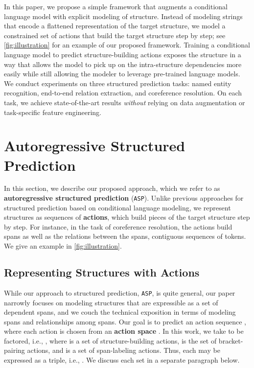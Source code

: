 \documentclass[11pt]{article}
\newcommand{\defn}[1]{\textbf{#1}}
\newcommand*{\asp}{\texttt{ASP}}
\begin{document}
In this paper, we propose a simple framework that augments a conditional language model with explicit modeling of structure.
Instead of modeling strings that encode a flattened representation of the target structure, we model a constrained set of actions that build the target structure step by step; see \cref{fig:illustration} for an example of our proposed framework.
Training a conditional language model to predict structure-building actions exposes the structure in a way that allows the model to pick up on the intra-structure dependencies more easily while still allowing the modeler to leverage pre-trained language models.
We conduct experiments on three structured prediction tasks: named entity recognition, end-to-end relation extraction, and coreference resolution. 
On each task, we achieve state-of-the-art results \emph{without} relying on data augmentation or task-specific feature engineering.
 
\section{Autoregressive Structured Prediction} \label{sec:model}

In this section, we describe our proposed approach, which we refer to as \textbf{autoregressive structured prediction} (\asp).
Unlike previous approaches for structured prediction based on conditional language modeling, we represent structures as sequences of \defn{actions}, which build pieces of the target structure step by step.
For instance, in the task of coreference resolution, the actions build spans as well as the relations between the spans, contiguous sequences of tokens.
We give an example in \cref{fig:illustration}.


\subsection{Representing Structures with Actions}
 While our approach to structured prediction, \asp, is quite general, our paper narrowly focuses on modeling structures that are expressible as a set of dependent spans, and we couch the technical exposition in terms of modeling spans and relationships among spans.
Our goal is to predict an action sequence , where each action  is chosen from an \defn{action space} .
In this work, we take  to be factored, i.e., , where  is a set of structure-building actions,  is the set of bracket-pairing actions, and  is a set of span-labeling actions. 
Thus, each  may be expressed as a triple, i.e., .
We discuss each set in a separate paragraph below.
\end{document}
